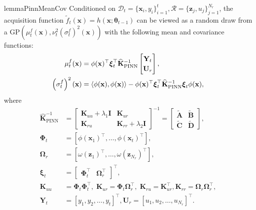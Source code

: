 \begin{restatable}{lemma}{PinnMeanCov} 
\label{lemma:pinn-bo_PINN_mean_cov}
Conditioned on $\mathcal{D}_t = \{\mathbf{x}_i, y_i\}_{i=1}^t, \mathcal{R} = \{\mathbf{z}_j, u_j\}_{j=1}^{N_r}$, the acquisition function $\widetilde{f}_t(\mathbf{x}) = h(\mathbf{x}; \boldsymbol{\theta}_{t-1})$ can be viewed as a random draw from a $\mathrm{GP}\left(\mu_{t}^f (\mathbf{x}), \nu_t^2 \left(\sigma^f_t\right)^2(\mathbf{x})\right)$ with the following mean and covariance functions:
\begin{equation*}
\begin{split}
     \mu_{t}^f (\mathbf{x}) &= \phi(\mathbf{x})^\top \boldsymbol{\xi}_t^\top \mathbf{\widehat{K}}_\mathrm{PINN}^{-1} 
     \renewcommand\arraystretch{1.2}
     \begin{bmatrix}
         \mathbf{Y}_t \\
         \mathbf{U}_r
     \end{bmatrix}, \\
    \left(\sigma^f_t\right)^2(\mathbf{x}) &=  \langle \phi(\mathbf{x}),  \phi(\mathbf{x}) \rangle - \phi(\mathbf{x})^\top \boldsymbol{\xi}_t^\top \mathbf{\widehat{K}}_\mathrm{PINN}^{-1} \boldsymbol{\xi}_t \phi(\mathbf{x}), \\
\end{split}
\end{equation*}
where 
\begin{equation*}
    \renewcommand\arraystretch{1.2}
    \begin{split}
\mathbf{\widehat{K}}_\mathrm{PINN}^{-1} &=  
    \begin{bmatrix}
    \mathbf{K}_{uu} + \lambda_1 \mathbf{I} & \mathbf{K}_{ur} \\
    \mathbf{K}_{ru} & \mathbf{K}_{rr} + \lambda_2 \mathbf{I}
    \end{bmatrix} ^{-1}  = \begin{bmatrix}
    \widetilde{\mathbf{A}} & \widetilde{\mathbf{B}} \\
    \widetilde{\mathbf{C}} & \widetilde{\mathbf{D}}
    \end{bmatrix}, \\
    \boldsymbol{\Phi}_t & = [\phi(\mathbf{x}_1)^\top,\dots, \phi(\mathbf{x}_t)^\top ], 
\\
    \boldsymbol{\Omega}_r & = [\omega(\mathbf{z}_1)^\top, \dots, \omega(\mathbf{z}_{N_r})^\top ], \\ 
 \boldsymbol{\xi}_t &= \begin{bmatrix}
    \boldsymbol{\Phi}_t^\top & \boldsymbol{\Omega}_r^\top  
    \end{bmatrix}^\top, 
\\
    \mathbf{K}_{uu} &= \boldsymbol{\Phi}_t \boldsymbol{\Phi}_t^\top, \;  \mathbf{K}_{ur} = \boldsymbol{\Phi}_t \boldsymbol{\Omega}_r^\top, \;
    \mathbf{K}_{ru} = \mathbf{K}_{ur}^\top, \mathbf{K}_{rr} = \boldsymbol{\Omega}_r \boldsymbol{\Omega}_r^\top, 
\\
    \mathbf{Y}_t &= [y_1, y_2, \dots, y_t]^\top, 
    \mathbf{U}_r = [u_1, u_2, \dots, u_{N_r}]^\top. \\
    \end{split}
\end{equation*}
\end{restatable}

